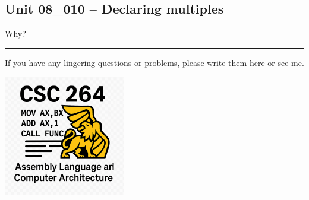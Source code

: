 \documentclass[letterpaper,12pt]{exam}
\newcommand{\unit}{Unit 08}
\begin{document}

\par{\selectfont\textbf{}}
\begin{questions}

\section*{\unit\_010 -- Declaring multiples }
\begin{samepage}
    \question Why?
    \vspace{5mm}
\end{samepage}
\par











\end{questions} 
\begin{center}
    \rule{0.667\textwidth}{.8pt} %
\end{center}


If you have any lingering questions or problems, please write them here or see me.
\vfill
\begin{center}
\includegraphics{../csc264Logo}
\end{center}
\end{document}
